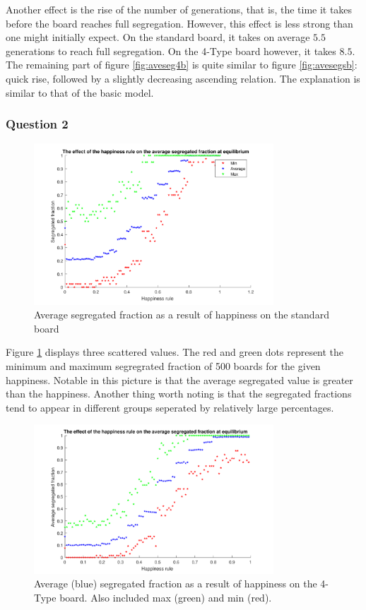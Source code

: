 Another effect is the rise of the number of generations, that is, the time it takes before the board reaches full segregation. 
However, this effect is less strong than one might initially expect. 
On the standard board, it takes on average $5.5$ generations to reach full segregation. On the 4-Type board however, it takes $8.5$.\\

The remaining part of figure \ref{fig:aveseg4b} is quite similar to figure \ref{fig:avesegsb}: quick rise, followed by a slightly decreasing ascending relation. 
The explanation is similar to that of the basic model.
\subsubsection{Question 2}
\begin{figure}[H]
    \centering
    \includegraphics[width=0.8\textwidth]{habysegfrac_sb_2}
    \caption{Average segregated fraction as a result of happiness on the standard board}
    \label{fig:happysegsb}
\end{figure}

Figure \ref{fig:happysegsb} displays three scattered values. 
The red and green dots represent the minimum and maximum segregrated fraction of 500 boards for the given happiness. 
Notable in this picture is that the average segregated value is greater than the happiness. 
Another thing worth noting is that the segregated fractions tend to appear in different groups seperated by relatively large percentages.

\begin{figure}[H]
    \centering
    \includegraphics[width=0.8\textwidth]{habysegfrac_4b_2}
    \caption{Average (blue) segregated fraction as a result of happiness on the 4-Type board. Also included max (green) and min (red).}
    \label{fig:happyseg4b}
\end{figure}

